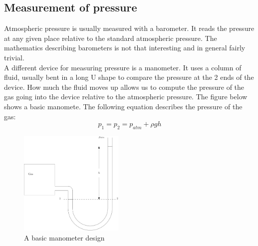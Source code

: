 \documentclass[11pt, a4paper]{article}
\begin{document}
\subsection{Measurement of pressure}
Atmospheric pressure is usually measured with a barometer. It reads the pressure at any given place relative to the standard atmospheric pressure. The mathematics describing barometers is not that interesting and in general fairly trivial.\\
A different device for measuring pressure is a manometer. It uses a column of fluid, usually bent in a long U shape to compare the pressure at the 2 ends of the device. How much the fluid moves up allows us to compute the pressure of the gas going into the device relative to the atmospheric pressure. The figure below shows a basic manomete. The following equation describes the pressure of the gas:
\begin{equation}
  p_1 = p_2 = p_{atm} + \rho gh
\end{equation}

\begin{figure}[h]
  \centerline{\includegraphics[width=50mm]{images/manometer.png}}
  \caption{A basic manometer design}
\end{figure}
\end{document}
